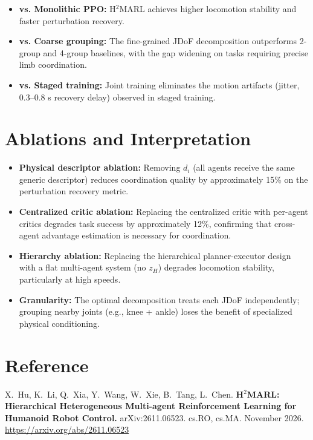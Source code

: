 \documentclass[10pt,twocolumn]{article}
\begin{document}
\begin{itemize}[leftmargin=1em,itemsep=2pt]
  \item \textbf{vs. Monolithic PPO:} H$^2$MARL achieves higher locomotion stability and faster perturbation recovery.
  \item \textbf{vs. Coarse grouping:} The fine-grained JDoF decomposition outperforms 2-group and 4-group baselines, with the gap widening on tasks requiring precise limb coordination.
  \item \textbf{vs. Staged training:} Joint training eliminates the motion artifacts (jitter, 0.3--0.8 s recovery delay) observed in staged training.
\end{itemize}

\section{Ablations and Interpretation}

\begin{itemize}[leftmargin=1em,itemsep=2pt]
  \item \textbf{Physical descriptor ablation:} Removing $d_i$ (all agents receive the same generic descriptor) reduces coordination quality by approximately 15\% on the perturbation recovery metric.
  \item \textbf{Centralized critic ablation:} Replacing the centralized critic with per-agent critics degrades task success by approximately 12\%, confirming that cross-agent advantage estimation is necessary for coordination.
  \item \textbf{Hierarchy ablation:} Replacing the hierarchical planner-executor design with a flat multi-agent system (no $z_H$) degrades locomotion stability, particularly at high speeds.
  \item \textbf{Granularity:} The optimal decomposition treats each JDoF independently; grouping nearby joints (e.g., knee + ankle) loses the benefit of specialized physical conditioning.
\end{itemize}

\section*{Reference}
X.\ Hu, K.\ Li, Q.\ Xia, Y.\ Wang, W.\ Xie, B.\ Tang, L.\ Chen.
\textbf{H$^2$MARL: Hierarchical Heterogeneous Multi-agent Reinforcement Learning for Humanoid Robot Control.}
arXiv:2611.06523. cs.RO, cs.MA. November 2026.
\url{https://arxiv.org/abs/2611.06523}
\end{document}
